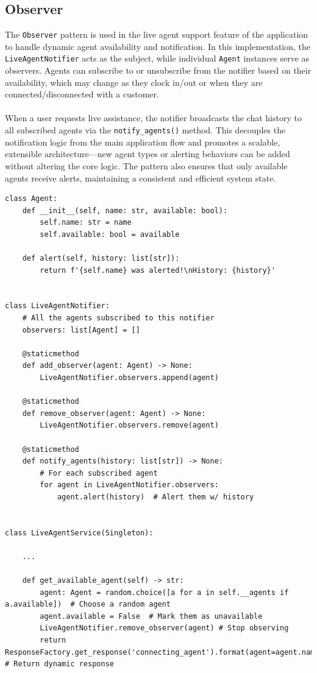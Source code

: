 \documentclass[11pt]{article}
\begin{document}
\subsection{Observer}
%
The \texttt{Observer} pattern is used in the live agent support feature of the application to handle dynamic agent availability and notification. In this implementation, the \texttt{LiveAgentNotifier} acts as the subject, while individual \texttt{Agent} instances serve as observers. Agents can subscribe to or unsubscribe from the notifier based on their availability, which may change as they clock in/out or when they are connected/disconnected with a customer. \\ \\
\noindent
When a user requests live assistance, the notifier broadcasts the chat history to all subscribed agents via the \texttt{notify\_agents()} method. This decouples the notification logic from the main application flow and promotes a scalable, extensible architecture—new agent types or alerting behaviors can be added without altering the core logic. The pattern also ensures that only available agents receive alerts, maintaining a consistent and efficient system state.
%
\begin{lstlisting}
class Agent:
    def __init__(self, name: str, available: bool):
        self.name: str = name
        self.available: bool = available

    def alert(self, history: list[str]):
        return f'{self.name} was alerted!\nHistory: {history}'


class LiveAgentNotifier:
    # All the agents subscribed to this notifier
    observers: list[Agent] = []

    @staticmethod
    def add_observer(agent: Agent) -> None:
        LiveAgentNotifier.observers.append(agent)

    @staticmethod
    def remove_observer(agent: Agent) -> None:
        LiveAgentNotifier.observers.remove(agent)

    @staticmethod
    def notify_agents(history: list[str]) -> None:
    	# For each subscribed agent
        for agent in LiveAgentNotifier.observers:  
            agent.alert(history)  # Alert them w/ history


class LiveAgentService(Singleton):

	...

    def get_available_agent(self) -> str:
        agent: Agent = random.choice([a for a in self.__agents if a.available])  # Choose a random agent
        agent.available = False  # Mark them as unavailable
        LiveAgentNotifier.remove_observer(agent) # Stop observing
        return ResponseFactory.get_response('connecting_agent').format(agent=agent.name)  # Return dynamic response
\end{lstlisting}
%
%
%
\end{document}
